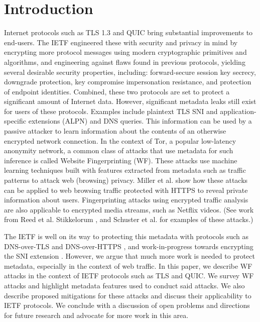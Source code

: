 \documentclass[runningheads]{llncs}
\begin{document}
\section{Introduction}
Internet protocols such as TLS 1.3 \cite{rfc8446} and QUIC \cite{ietf-quic-transport-16}
bring substantial improvements to end-users.
The IETF engineered these with security and privacy in mind by encrypting
more protocol messages using modern cryptographic primitives and algorithms, and engineering
against flaws found in previous protocols, yielding several desirable security
properties, including: forward-secure session key secrecy, downgrade protection, key
compromise impersonation resistance, and protection of endpoint identities.
Combined, these two protocols are set to protect a significant amount of Internet data.
However, significant metadata leaks still exist for users of these protocols. Examples include
plaintext TLS SNI and application-specific extensions (ALPN) and DNS queries. This information
can be used by a passive attacker to learn information about the contents of an otherwise
encrypted network connection. In the context of Tor, a popular low-latency anonymity
network, a common class of attacks that use metadata for such inference is called
Website Fingerprinting (WF). These attacks use machine learning techniques built with
features extracted from metadata such as traffic patterns to attack web (browsing) privacy.
Miller et al. \cite{miller2014know} show how these attacks can be applied to web browsing
traffic protected with HTTPS to reveal private information about users.
Fingerprinting attacks using encrypted traffic analysis are also applicable to encrypted
media streams, such as Netflix videos. (See work from Reed et al. \cite{reed2017identifying}
Stikkelorum \cite{stikkelorum2017know}, and Schuster et al. \cite{schuster2017beauty}
for examples of these attacks.)

The IETF is well on its way to protecting this metadata with protocols such as DNS-over-TLS
and DNS-over-HTTPS \cite{rfc8484}, and work-in-progress towards encrypting
the SNI extension \cite{ietf-tls-esni-02}. However, we argue
that much more work is needed to protect metadata, especially in the context of web traffic.
In this paper, we describe WF attacks in the context of IETF protocols
such as TLS and QUIC. We survey WF attacks and highlight metadata features used to conduct
said attacks. We also describe proposed mitigations for these attacks and discuss their
applicability to IETF protocols. We conclude with a discussion of open problems and directions
for future research and advocate for more work in this area.
\end{document}
